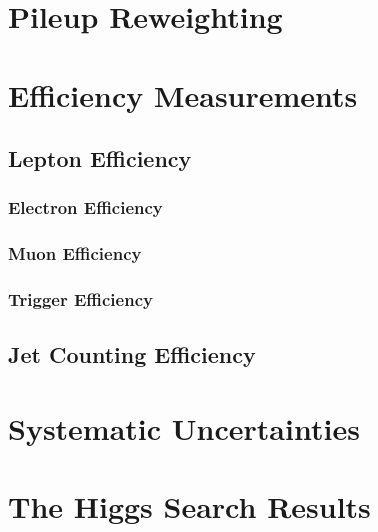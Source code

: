 \documentclass{cmspaper}
\begin{document}
\section{Pileup Reweighting}
     \label{sec:pileupReweighting}
     

\section{Efficiency Measurements}
     \label{sec:alleff}
     \subsection{Lepton Efficiency}
     \label{sec:efficiency}
     
	 \subsubsection{Electron Efficiency}
	 \label{sec:eff_electron}
	 
	 \subsubsection{Muon Efficiency}
	 \label{sec:eff_muon}
	 
	 \subsubsection{Trigger Efficiency}
	 \label{sec:eff_trigger}
	 
     \subsection{Jet Counting Efficiency}
     

\section{Systematic Uncertainties}
   \label{sec:systematics}
   

\newpage 

%    

\section{The Higgs Search Results}
   \label{sec:dataresults}
   
\end{document}
